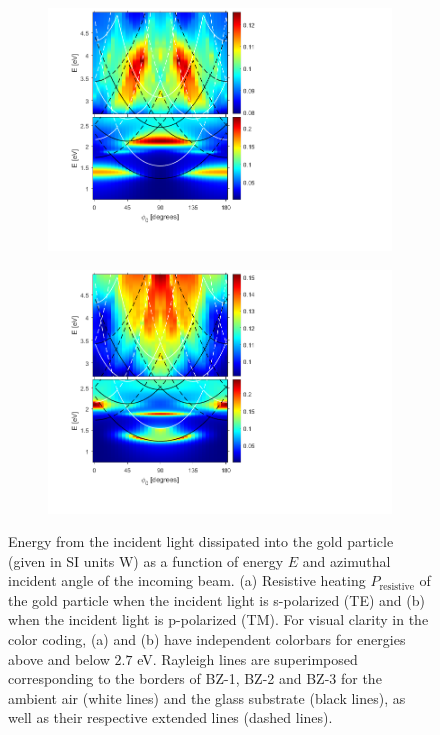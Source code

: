\begin{figure}[h]
    \begin{subfigure}{0.49\textwidth}
        \centering
        \includegraphics[width=\linewidth, trim=1.3cm  1.5cm 7.9cm 0cm, clip]{figures/ch4/S5B/contour/S5B_heatloss_TE_noscaling.png}
        \caption{}
        \label{}
    \end{subfigure}
    \begin{subfigure}{0.49\textwidth}
        \centering
        \includegraphics[width=\linewidth,trim=1.3cm  1.5cm 7.9cm 0cm, clip]{figures/ch4/S5B/contour/S5B_heatloss_TM_noscaling.png}
        \caption{}
        \label{}
    \end{subfigure}
    \label{fig:S5B_contour_heatloss}
    \caption{Energy from the incident light dissipated into the gold particle (given in SI units W) as a function of energy $E$ and azimuthal incident angle of the incoming beam. (a) Resistive heating $P_\text{resistive}$ of the gold particle when the incident light is s-polarized (TE) and (b) when the incident light is p-polarized (TM). For visual clarity in the color coding, (a) and (b) have independent colorbars for energies above and below $2.7$ eV. Rayleigh lines are superimposed corresponding to the borders of BZ-1, BZ-2 and BZ-3 for the ambient air (white lines) and the glass substrate (black lines), as well as their respective extended lines (dashed lines).}
\end{figure}

